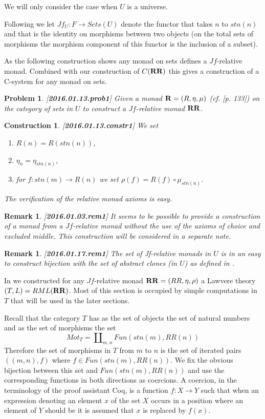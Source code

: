 \documentclass[11pt]{article}
\newtheorem{remark}[proposition]{Remark}
\newtheorem{problem}[proposition]{Problem}
\newtheorem{construction}[proposition]{Construction}
\newcommand{\llabel}[1]{\label{#1}[{\bf #1}]}
\newcommand{\sr}{\rightarrow}
\newcommand{\mbind}{\rho}
\newcommand{\RR}{{\bf RR}}
\begin{document}
We will only consider the case when $U$ is a universe.

Following \cite{ACU} we let $Jf_U:F\sr Sets(U)$ denote the functor that takes $n$ to $stn(n)$ and that is the identity on morphisms between two objects (on the total sets of morphisms the morphism component of this functor is the inclusion of a subset). 

As the following construction shows any monad on sets defines a $Jf$-relative monad. Combined with our construction of $C(\RR)$ this gives a construction of a C-system for any monad on sets. 

\begin{problem}\llabel{2016.01.13.prob1}
Given a monad ${\bf R}=(R,\eta,\mu)$ (cf. \cite{MacLane}[p. 133]) on the category of sets in $U$ to construct a $Jf$-relative monad $\RR$.
\end{problem}
%
\begin{construction}\rm\llabel{2016.01.13.constr1}
We set 
%
\begin{enumerate}
\item $R(n)=R(stn(n))$,
\item $\eta_n=\eta_{stn(n)}$,
\item for $f:stn(m)\sr R(n)$ we set $\mbind(f)=R(f)\circ \mu_{stn(n)}$.
\end{enumerate}
%
The verification of the relative monad axioms is easy.
\end{construction}
%
\begin{remark}\rm\llabel{2016.01.03.rem1}
It seems to be possible to provide a construction of a monad from a $Jf$-relative monad without the use of the axioms of choice and excluded middle. This construction will be considered in a separate note.
\end{remark}
%
\begin{remark}\rm\llabel{2016.01.17.rem1}
The set of Jf-relative monads in $U$ is in an easy to construct bijection with the set of abstract clones (in $U$) as defined in \cite[Section 3]{FPT}. 
\end{remark}





In \cite{LandJf} we constructed for any $Jf$-relative monad $\RR=(RR,\eta,\mbind)$ a Lawvere theory $(T,L)=RML(\RR)$. Most of this section is occupied by simple computations in $T$ that will be used in the later sections.

Recall that the category $T$ has as the set of objects the set of natural numbers and as the set of morphisms the set 
%
$$Mot_T=\amalg_{m,n} Fun(stn(m),RR(n))$$
%
Therefore the set of morphisms in $T$ from $m$ to $n$ is the set of iterated pairs $((m,n),f)$ where $f\in Fun(stn(m),RR(n))$. We fix the obvious bijection between this set and $Fun(stn(m),RR(n))$ and use the corresponding functions in both directions as coercions. A coercion, in the terminology of the proof assistant Coq, is a function $f:X\sr Y$ such that when an expression denoting an element $x$ of the set $X$ occurs in a position where an element of $Y$ should be it is assumed that $x$ is replaced by $f(x)$.
\end{document}
